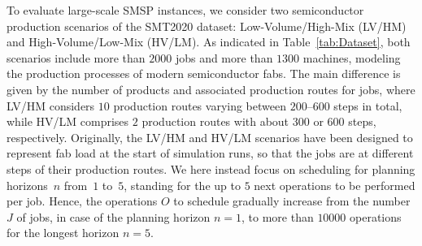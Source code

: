 \documentclass[runningheads]{llncs}
\begin{document}
%
To evaluate large-scale SMSP instances,
we consider two semiconductor production scenarios of the SMT2020 dataset:
Low-Volume/High-Mix (LV/HM) and High-Volume/Low-Mix (HV/LM).
As indicated in Table~\ref{tab:Dataset},
both scenarios include more than $2000$ jobs and more than $1300$ machines,
modeling the production processes of modern semiconductor fabs.
The main difference is given by the number of products and associated production routes for jobs, where LV/HM considers $10$ production routes varying between
$200$--$600$ steps in total, while HV/LM comprises $2$ production routes with about
$300$ or $600$ steps, respectively.
Originally, the LV/HM and HV/LM scenarios have been designed to represent fab load at the
start of simulation runs, so that the jobs are at different steps of their
production routes.
We here instead focus on scheduling for planning horizons~$n$ from~$1$ to~$5$,
standing for the up to $5$ next operations to be performed per job.
Hence, the operations $O$ to schedule gradually increase from the
number $J$ of jobs, in case of the planning horizon $n=1$,
to more than $10000$ operations %
for the longest %
horizon $n=5$.
\end{document}
